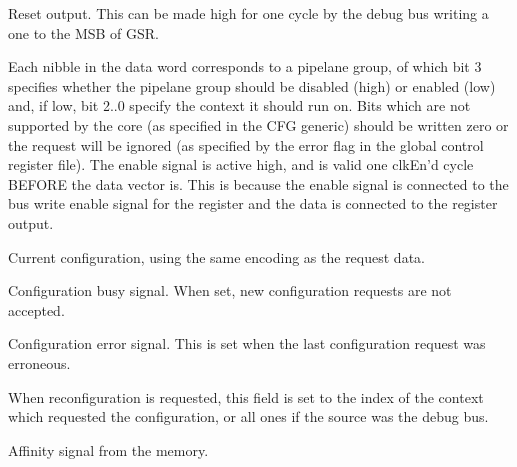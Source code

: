 
\globalInterface{}

\ifaceSubGroup{}
Reset output. This can be made high for one cycle by the debug bus writing a one
to the MSB of GSR.

\ifaceSubGroup{}
Each nibble in the data word corresponds to a pipelane group, of which bit 3 
specifies whether the pipelane group should be disabled (high) or enabled (low) 
and, if low, bit 2..0 specify the context it should run on. Bits which are not 
supported by the core (as specified in the CFG generic) should be written zero 
or the request will be ignored (as specified by the error flag in the global 
control register file). The enable signal is active high, and is valid one 
clkEn'd cycle BEFORE the data vector is. This is because the enable signal is 
connected to the bus write enable signal for the register and the data is 
connected to the register output.

\ifaceSubGroup{}
Current configuration, using the same encoding as the request data.
    
\ifaceSubGroup{}
Configuration busy signal. When set, new configuration requests are not 
accepted.
    
\ifaceSubGroup{}
Configuration error signal. This is set when the last configuration request was 
erroneous.
    
\ifaceSubGroup{}
When reconfiguration is requested, this field is set to the index of the context 
which requested the configuration, or all ones if the source was the debug bus.

\ifaceSubGroup{}
Affinity signal from the memory.

